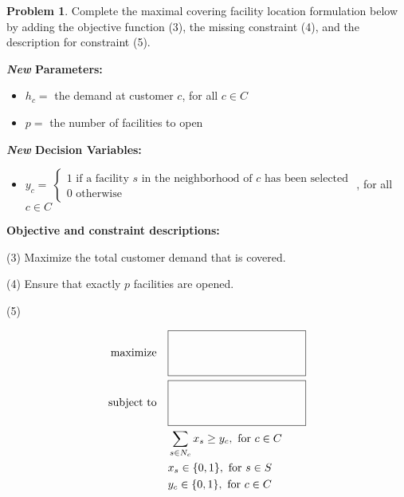 \documentclass[11pt]{article}
\theoremstyle{definition}
\newtheorem{problem}{Problem}
\newcommand{\answerbox}[3]{%
  \fbox{%
    \begin{minipage}[#1]{#2}
      \hfill\vspace{#3}
    \end{minipage}
  }
}
\newcommand{\answerboxone}[2]{%
  \answerbox{#1}{6.0in}{#2} 
}
\newcommand{\maximize}{\text{maximize}}
\newcommand{\subjectto}{\text{subject to}}
\begin{document}
\bigskip
\begin{problem}
Complete the maximal covering facility location formulation below by adding the objective function (3),  the missing constraint (4), and the description for constraint (5).
\end{problem}
\bigskip


\begin{center}
\end{center}

\textbf{
\emph{New} Parameters: }
\begin{itemize}
\item[] $h_c = $ the demand at customer $c$, for all $c \in C$
\item[]  $p = $ the number of facilities to open
\end{itemize}

\textbf{\emph{New} Decision Variables: }
\begin{itemize}
\item[] \def\arraystretch{1.8} $y_c = ~\left\{ \begin{array}{ll} 1 \text{ if a facility $s$ in the neighborhood of $c$ has been selected} \\ 0 \text{ otherwise } \end{array} \right. $
, for all $c \in C$
\end{itemize}

\textbf{Objective and constraint descriptions:} 

(3) Maximize the total customer demand that is covered. %

(4) Ensure that exactly $p$ facilities are opened.

(5) \answerboxone{c}{1.7cm}

    \begin{align}
      \maximize \quad & \answerbox{c}{4cm}{1.2 cm} \\ %
      \subjectto \quad  &  \answerbox{c}{4cm}{1.2 cm} \\  %
					& \sum_{s \in N_c} x_s \geq y_c, \text{ for } c \in C \\
                       & x_s \in \{0,1\}, \text{ for } s \in S \nonumber\\
                       & y_c \in \{0,1\}, \text{ for } c \in C \nonumber
    \end{align}
\end{document}
